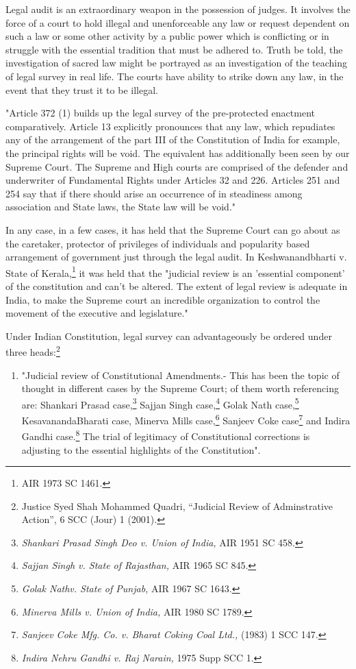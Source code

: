 \begin{multicols}{2}
\noi
Legal audit is an extraordinary weapon in the possession of judges. It involves the force of a
court to hold illegal and unenforceable any law or request dependent on such a law or some
other activity by a public power which is conflicting or in struggle with the essential tradition
that must be adhered to. Truth be told, the investigation of sacred law might be portrayed as
an investigation of the teaching of legal survey in real life. The courts have ability to strike
down any law, in the event that they trust it to be illegal.

\noi
"Article 372 (1) builds up the legal survey of the pre-protected enactment comparatively.
Article 13 explicitly pronounces that any law, which repudiates any of the arrangement of the
part III of the Constitution of India for example, the principal rights will be void. The
equivalent has additionally been seen by our Supreme Court. The Supreme and High courts
are comprised of the defender and underwriter of Fundamental Rights under Articles 32 and
226. Articles 251 and 254 say that if there should arise an occurrence of in steadiness among
association and State laws, the State law will be void."

\noi
In any case, in a few cases, it has held that the Supreme Court can go about as the caretaker,
protector of privileges of individuals and popularity based arrangement of government just
through the legal audit. In Keshwanandbharti v. State of Kerala,\footnote{AIR 1973 SC 1461.} it was held that the
"judicial review is an 'essential component' of the constitution and can't be altered. The extent
of legal review is adequate in India, to make the Supreme court an incredible organization to
control the movement of the executive and legislature."

\noi
Under Indian Constitution, legal survey can advantageously be ordered under three heads:\footnote{Justice Syed Shah Mohammed Quadri, “Judicial Review of Adminstrative Action”, 6 SCC (Jour) 1 (2001).}

\vspace{-.3cm}

\noi
\begin{enumerate}[label=\roman*)]
\itemsep=0pt
\item "Judicial review of Constitutional Amendments.- This has been the topic of thought in
different cases by the Supreme Court; of them worth referencing are: Shankari Prasad case,\footnote{\textit{Shankari Prasad Singh Deo v. Union of India,} AIR 1951 SC 458.}
Sajjan Singh case,\footnote{\textit{Sajjan Singh v. State of Rajasthan,} AIR 1965 SC 845.} Golak Nath case,\footnote{\textit{Golak Nathv. State of Punjab,} AIR 1967 SC 1643.} KesavanandaBharati case, Minerva Mills case,\footnote{\textit{Minerva Mills v. Union of India,} AIR 1980 SC 1789.} Sanjeev Coke case\footnote{\textit{Sanjeev Coke Mfg. Co. v. Bharat Coking Coal Ltd.,} (1983) 1 SCC 147.} and Indira Gandhi case.\footnote{\textit{Indira Nehru Gandhi v. Raj Narain,} 1975 Supp SCC 1.} The trial of legitimacy of Constitutional
corrections is adjusting to the essential highlights of the Constitution".


\end{enumerate}
\end{multicols}
